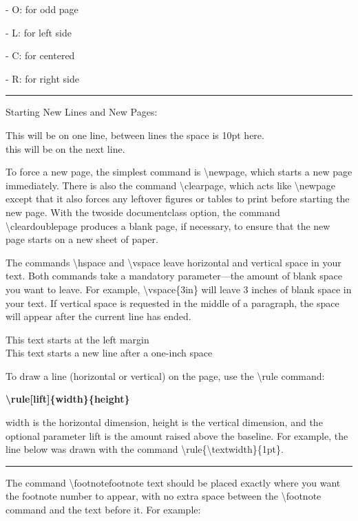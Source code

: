 \documentclass[12pt,openright]{book}
\begin{document}
- O: for odd page

- L: for left side

- C: for centered

- R: for right side

\vskip 0.05in
\rule{\textwidth}{0.5pt}
\vskip 0.05in

Starting New Lines and New Pages:

This will be on one line, between lines the space is 10pt here. \\[10pt] this will be on the next line. 

To force a new page, the simplest command is \textbackslash newpage, which starts a new page immediately. There is also the command \textbackslash clearpage, which acts like \textbackslash newpage except that it also forces any leftover figures or tables to print before starting the new page. With the twoside documentclass option, the command \textbackslash cleardoublepage produces a blank page, if necessary, to ensure that the new page starts on a new sheet of paper.

The commands \textbackslash hspace and \textbackslash vspace leave horizontal and vertical space in your text. Both commands take a mandatory parameter—the amount of blank space you want to leave. For example, \textbackslash vspace\{3in\} will leave 3 inches of blank space in your text. If vertical space is requested in the middle of a paragraph, the space will appear after the current line has ended.

This text starts at the left margin\\
\hspace*{1in}This text starts a new line after a one-inch space

To draw a line (horizontal or vertical) on the page, use the \textbackslash rule command:

\textbf{\textbackslash rule[lift]\{width\}\{height\}}

width is the horizontal dimension, height is the vertical dimension, and the optional
parameter lift is the amount raised above the baseline. For example, the line below was
drawn with the command \textbackslash rule\{\textbackslash textwidth\}\{1pt\}.

\rule{\textwidth}{1pt}

The command \textbackslash footnote{footnote text} should be placed exactly where you want the footnote number to appear, with no extra space between the \textbackslash footnote command and the text before it. For example: 
\end{document}
